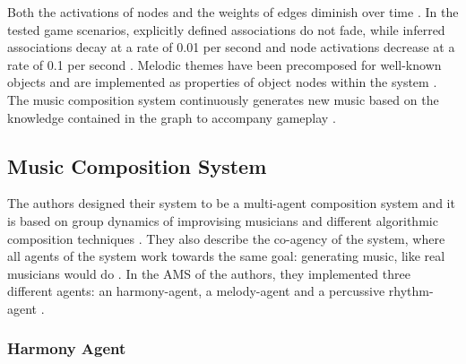 Both the activations of nodes and the weights of edges diminish
over time \cite{hutMcCormAms}. In the tested game scenarios, 
explicitly defined associations do not fade, while inferred 
associations decay at a rate of 0.01 per second and node 
activations decrease at a rate of 0.1 per second
\cite{hutMcCormAms}.
Melodic themes have been precomposed for well-known objects and are implemented as properties of object nodes within the system \cite{hutMcCormAms}. The music composition system continuously generates new music based on the knowledge contained in the graph to accompany gameplay \cite{hutMcCormAms}. 

\subsection{Music Composition System}

The authors designed their system to be a multi-agent composition system \cite{hutMcCormAms} and it is based on group dynamics of 
improvising musicians and different algorithmic composition
techniques \cite{hutMcCormAms}.
They also describe the co-agency of the system, where all agents
of the system work towards the same goal: generating music, like
real musicians would do \cite{hutMcCormAms}.
In the AMS of the authors, they implemented three different agents:
an harmony-agent, a melody-agent and a percussive rhythm-agent \cite{hutMcCormAms}.

\subsubsection{Harmony Agent}




